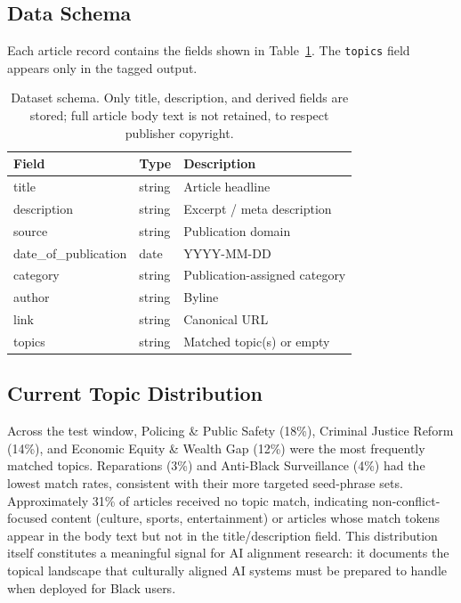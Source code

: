 \documentclass[letterpaper]{article}
\begin{document}
\subsection{Data Schema}

Each article record contains the fields shown in Table~\ref{tab:schema}.
The \texttt{topics} field appears only in the tagged output.

\begin{table}[t]
\centering
\small
\begin{tabular}{lll}
\toprule
Field & Type & Description \\
\midrule
title               & string & Article headline \\
description         & string & Excerpt / meta description \\
source              & string & Publication domain \\
date\_of\_publication & date   & YYYY-MM-DD \\
category            & string & Publication-assigned category \\
author              & string & Byline \\
link                & string & Canonical URL \\
topics              & string & Matched topic(s) or empty \\
\bottomrule
\end{tabular}
\caption{Dataset schema. Only title, description, and derived fields are
stored; full article body text is not retained, to respect publisher
copyright.}
\label{tab:schema}
\end{table}

\subsection{Current Topic Distribution}

Across the test window, Policing \& Public Safety (18\%), Criminal
Justice Reform (14\%), and Economic Equity \& Wealth Gap (12\%) were the
most frequently matched topics. Reparations (3\%) and Anti-Black
Surveillance (4\%) had the lowest match rates, consistent with their
more targeted seed-phrase sets. Approximately 31\% of articles received
no topic match, indicating non-conflict-focused content (culture,
sports, entertainment) or articles whose match tokens appear in the
body text but not in the title/description field. This distribution
itself constitutes a meaningful signal for AI alignment research: it
documents the topical landscape that culturally aligned AI systems must
be prepared to handle when deployed for Black users.
\end{document}

